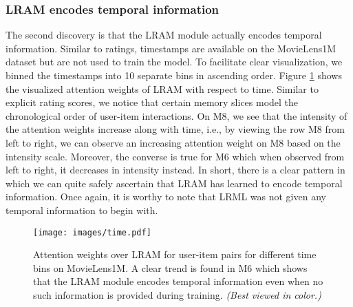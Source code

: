 \documentclass[sigconf]{acmart}
\begin{document}
\subsubsection{LRAM encodes temporal information}
The second discovery is that the LRAM module actually encodes temporal information. Similar to ratings, timestamps are available on the MovieLens1M dataset but are not used to train the model. To facilitate clear visualization, we binned the timestamps into 10 separate bins in ascending order. Figure \ref{fig:time} shows the visualized attention weights of LRAM with respect to time. Similar to explicit rating scores, we notice that certain memory slices model the chronological order of user-item interactions. On M8, we see that the intensity of the attention weights increase along with time, i.e., by viewing the row M8 from left to right, we can observe an increasing attention weight on M8 based on the intensity scale. Moreover, the converse is true for M6 which when observed from left to right, it decreases in intensity instead. In short, there is a clear pattern in which we can quite safely ascertain that LRAM has learned to encode temporal information. Once again, it is worthy to note that \textsc{LRML} was not given any temporal information to begin with. 

\begin{figure}[ht]
\begin{center}
\texttt{[image: images/time.pdf]}
\caption{Attention weights over LRAM for user-item pairs for different time bins on MovieLens1M. A clear trend is found in M6 which shows that the LRAM module encodes temporal information even when no such information is provided during training. \textit{(Best viewed in color.)} } 
\label{fig:time}
\end{center}
\end{figure}
\end{document}
